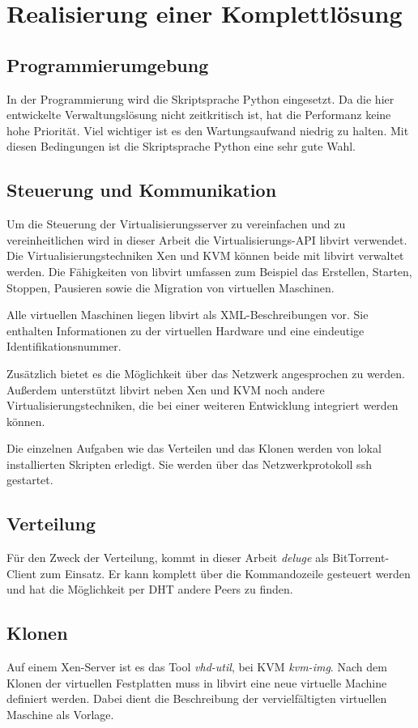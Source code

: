 \section{Realisierung einer Komplettlösung}
\subsection{Programmierumgebung}
In der Programmierung wird die Skriptsprache Python eingesetzt. Da die hier entwickelte Verwaltungslösung nicht zeitkritisch ist, hat die Performanz keine hohe Priorität. Viel wichtiger ist es den Wartungsaufwand niedrig zu halten. Mit diesen Bedingungen ist die Skriptsprache Python eine sehr gute Wahl.

\subsection{Steuerung und Kommunikation}
Um die Steuerung der Virtualisierungsserver zu vereinfachen und zu vereinheitlichen wird in dieser Arbeit die Virtualisierungs-API libvirt verwendet. Die Virtualisierungstechniken Xen und KVM können beide mit libvirt verwaltet werden. Die Fähigkeiten von libvirt umfassen zum Beispiel das Erstellen, Starten, Stoppen, Pausieren sowie die Migration von virtuellen Maschinen. 

Alle virtuellen Maschinen liegen libvirt als XML-Beschreibungen vor. Sie enthalten Informationen zu der virtuellen Hardware und eine eindeutige Identifikationsnummer. 

Zusätzlich bietet es die Möglichkeit über das Netzwerk angesprochen zu werden. Außerdem unterstützt libvirt neben Xen und KVM noch andere Virtualisierungstechniken, die bei einer weiteren Entwicklung integriert werden können. %

Die einzelnen Aufgaben wie das Verteilen und das Klonen werden von lokal installierten Skripten erledigt. Sie werden über das Netzwerkprotokoll ssh gestartet.


\subsection{Verteilung}
Für den Zweck der Verteilung, kommt in dieser Arbeit \textit{deluge} als BitTorrent-Client zum Einsatz. Er kann komplett über die Kommandozeile gesteuert werden und hat die Möglichkeit per DHT andere Peers zu finden.
\subsection{Klonen}
Auf einem Xen-Server ist es das Tool \textit{vhd-util}, bei KVM \textit{kvm-img}. Nach dem Klonen der virtuellen Festplatten muss in libvirt eine neue virtuelle Machine definiert werden. Dabei dient die Beschreibung der vervielfältigten virtuellen  Maschine als Vorlage.